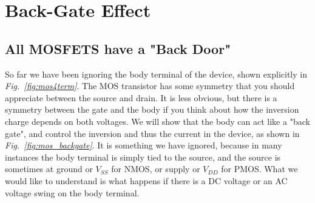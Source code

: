 \section{Back-Gate Effect}
\subsection{All MOSFETS have a "Back Door"}
So far we have been ignoring the body terminal of the device, shown explicitly in \emph{Fig.~\ref{fig:mos4term}}.  The MOS transistor has some symmetry that you should appreciate between the source and drain.  It is less obvious, but there is a symmetry between the gate and the body if you think about how the inversion charge depends on both voltages. We will show that the body can act like a "back gate", and control the inversion and thus the current in the device, as shown in \emph{Fig.~\ref{fig:mos_backgate}}.  It is something we have ignored, because in many instances the body terminal is simply tied to the source, and the source is sometimes at ground or $V_{SS}$ for NMOS, or supply or $V_{DD}$ for PMOS.  What we would like to understand is what happens if there is a DC voltage or an AC voltage swing on the body terminal.
